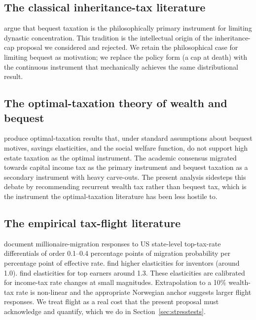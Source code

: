 \documentclass[11pt]{article}
\begin{document}
\subsection{The classical inheritance-tax literature}

\citet{mill1848principles, carnegie1889wealth, rignano1924bequest,
atkinson2015inequality} argue that bequest taxation is the
philosophically primary instrument for limiting dynastic
concentration.  This tradition is the intellectual origin of the
inheritance-cap proposal we considered and rejected.  We retain
the philosophical case for limiting bequest as motivation; we
replace the policy form (a cap at death) with the continuous
instrument that mechanically achieves the same distributional
result.

\subsection{The optimal-taxation theory of wealth and bequest}

\citet{piketty2013theory, farhi2010progressive, saez2018social,
saez2019progressive} produce optimal-taxation results that, under
standard assumptions about bequest motives, savings elasticities,
and the social welfare function, do not support high estate
taxation as the optimal instrument.  The academic consensus migrated
towards capital income tax as the primary instrument and bequest
taxation as a secondary instrument with heavy carve-outs.  The
present analysis sidesteps this debate by recommending recurrent
wealth tax rather than bequest tax, which is the instrument the
optimal-taxation literature has been less hostile to.

\subsection{The empirical tax-flight literature}

\citet{young2016millionaire} document millionaire-migration
responses to US state-level top-tax-rate differentials of order
0.1--0.4 percentage points of migration probability per
percentage point of effective rate.  \citet{akcigit2016inventors}
find higher elasticities for inventors (around 1.0).
\citet{moretti2017taxing} find elasticities for top earners around
1.3.  These elasticities are calibrated for income-tax rate
changes at small magnitudes.  Extrapolation to a 10\% wealth-tax
rate is non-linear and the appropriate Norwegian anchor
\citep{ringstad2024norwegian} suggests larger flight responses.
We treat flight as a real cost that the present proposal must
acknowledge and quantify, which we do in Section~\ref{sec:stresstests}.
\end{document}
